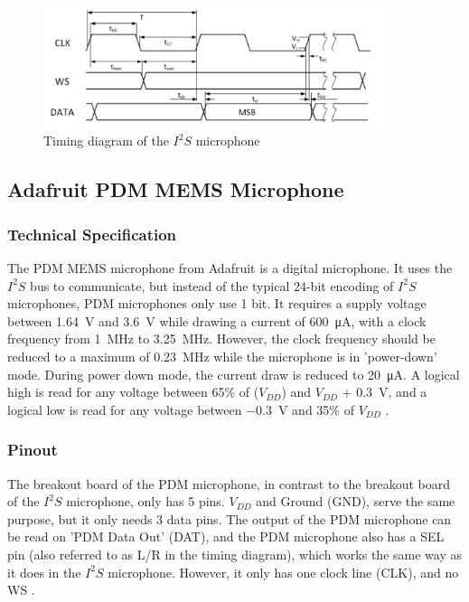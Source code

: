\begin{figure}[htb]
    \centering
    \includegraphics[width=0.9\textwidth]{figures/i2s_timing.png}
    \caption[Timing diagram of the SPH0645LM4H-B $I^2S$ mic \cite{i2s_mic_datasheet}]{Timing diagram of the $I^2S$ microphone}
    \label{fig:i2s_timing}
\end{figure}

\subsection{Adafruit PDM MEMS Microphone}

\subsubsection{Technical Specification}

The PDM MEMS microphone from Adafruit \cite{pdm_mic} is a digital microphone.
It uses the $I^2S$ bus to communicate, but instead of the typical 24-bit encoding of $I^2S$ microphones, PDM microphones only use 1 bit.
It requires a supply voltage between \SI{1.64}{\volt} and \SI{3.6}{\volt} while drawing a current of \SI{600}{\micro\ampere}, with a clock
frequency from \SI{1}{\mega\hertz} to \SI{3.25}{\mega\hertz}.
However, the clock frequency should be reduced to a maximum of \SI{0.23}{\mega\hertz} while the microphone is in 'power-down' mode.
During power down mode, the current draw is reduced to \SI{20}{\micro\ampere}.
A logical high is read for any voltage between 65\% of ($V_{DD}$) and $V_{DD}$ + \SI{0.3}{\volt},
and a logical low is read for any voltage between \SI{-0.3}{\volt} and 35\% of $V_{DD}$ \cite{pdm_mic_datasheet}.

\subsubsection{Pinout}

The breakout board of the PDM microphone, in contrast to the breakout board of the $I^2S$ microphone, only has 5 pins.
$V_{DD}$ and Ground (GND), serve the same purpose, but it only needs 3 data pins.
The output of the PDM microphone can be read on 'PDM Data Out' (DAT), and the PDM microphone also has a SEL pin (also referred to as L/R in the timing diagram),
which works the same way as it does in the $I^2S$ microphone.
However, it only has one clock line (CLK), and no WS \cite{pdm_mic_pinout}.

